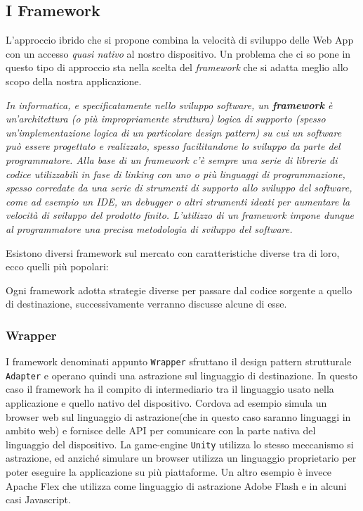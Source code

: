 \subsection{I Framework}
L'approccio ibrido che si propone combina la velocità di sviluppo delle Web App con un accesso \emph{quasi nativo} al nostro dispositivo. Un problema che ci so pone in questo tipo di approccio sta nella scelta del \emph{framework} che si adatta  meglio allo scopo della nostra applicazione.

\textit{In informatica, e specificatamente nello sviluppo software, un \textbf{framework} è un'architettura (o più impropriamente struttura) logica di supporto (spesso un'implementazione logica di un particolare design pattern) su cui un software può essere progettato e realizzato, spesso facilitandone lo sviluppo da parte del programmatore. Alla base di un framework c'è sempre una serie di librerie di codice utilizzabili in fase di linking con uno o più linguaggi di programmazione, spesso corredate da una serie di strumenti di supporto allo sviluppo del software, come ad esempio un IDE, un debugger o altri strumenti ideati per aumentare la velocità di sviluppo del prodotto finito. L'utilizzo di un framework impone dunque al programmatore una precisa metodologia di sviluppo del software.}\\
\hspace*{\fill}\citeauthor{wiki:framework}

Esistono diversi framework sul mercato con caratteristiche diverse tra di loro, ecco quelli più popolari:


Ogni framework adotta strategie diverse per passare dal codice sorgente a quello di destinazione, successivamente verranno discusse alcune di esse.

\subsubsection{Wrapper}
I framework denominati appunto \texttt{Wrapper} sfruttano il design pattern strutturale \texttt{Adapter} e operano quindi una astrazione sul linguaggio di destinazione. In questo caso il framework ha il compito di intermediario tra il linguaggio usato nella applicazione e quello nativo del dispositivo.
Cordova ad esempio simula un browser web sul linguaggio di astrazione(che in questo caso saranno linguaggi in ambito web) e fornisce delle API per comunicare con la parte nativa del linguaggio del dispositivo.
La game-engine \texttt{Unity} utilizza lo stesso meccanismo si astrazione, ed anziché simulare un browser utilizza un linguaggio proprietario per poter eseguire la applicazione su più piattaforme.
Un altro esempio è invece Apache Flex che utilizza come linguaggio di astrazione Adobe Flash e in alcuni casi Javascript.

